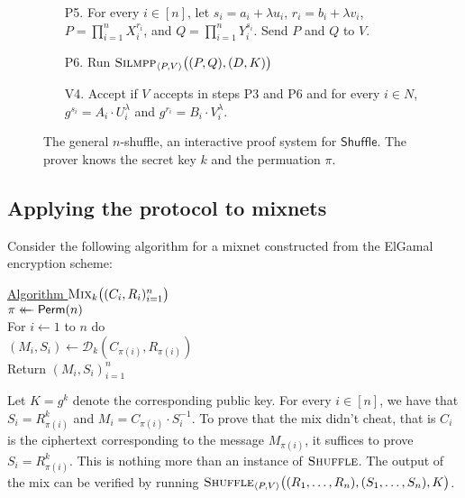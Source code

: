 \documentclass[letter]{article}
\newcommand{\getsr}{\mathrel{\leftarrow\mkern-14mu\leftarrow}}
\newcommand{\brackets}[1]{\langle #1 \rangle}
\newcommand{\Perm}{\textsf{Perm}}
\newcommand{\dec}{\mathcal{D}}
\begin{document}
\begin{figure}[h]
{\begin{enumerate}
    \vspace{4pt}
    \item[P5.] For every $i \in [n]$, let $s_i = a_i + \lambda u_i$,
      $r_i = b_i + \lambda v_i$, $P = \prod_{i=1}^n X_i^{r_i}$, and
      $Q = \prod_{i=1}^n Y_i^{s_i}$. Send $P$ and $Q$ to $V$.

    \vspace{4pt}
    \item[P6.] Run $\textsc{Silmpp}_{\brackets{P,V}}\big( (P,Q), (D,K) \big)$

    \vspace{4pt}
    \item[V4.] Accept if $V$ accepts in steps P3 and P6 and for every $i \in N$,
      $g^{s_i} = A_i \cdot U_i^\lambda$ and
      $g^{r_i} = B_i \cdot V_i^\lambda$.

  \end{enumerate}
  }
  \caption{The general $n$-shuffle, an interactive proof system for
    $\textsf{Shuffle}$. The prover knows the secret key  $k$ and the permuation
    $\pi$.
  }
  \label{fig-shuffle}
\end{figure}

\subsection{Applying the protocol to mixnets} \label{sec-mix-shuffle}
Consider the following algorithm for a mixnet constructed from the ElGamal
encryption scheme:
\newcommand{\ind}{\hspace{12pt}}
\begin{tabbing}
  \underline{Algorithm $\textsc{Mix}_k\big( (C_i, R_i)_{i=1}^n \big)$}\\[4pt]
  \ind $\pi \getsr \Perm(n)$\\
  \ind For $i \gets 1$ to $n$ do \\
  \ind\ind $(M_i, S_i) \gets \dec_k(C_{\pi(i)}, R_{\pi(i)})$ \\
  \ind Return $(M_i, S_i)_{i=1}^n$
\end{tabbing}
Let $K = g^k$ denote the corresponding public key.
For every $i \in [n]$, we have that $S_i = R_{\pi(i)}^k$ and $M_i = C_{\pi(i)}
\cdot S_i^{-1}$. To prove that the mix didn't cheat, that is $C_{i}$ is the ciphertext
corresponding to the message $M_{\pi(i)}$, it suffices to prove $S_i =
R_{\pi(i)}^k$. This is nothing more than an instance of $\textsc{Shuffle}$. The
output of the mix can be verified by running
$\textsc{Shuffle}_{\brackets{P,V}}\big( (R_1, \dots, R_n), (S_1, \dots, S_n), K
\big)$.
\end{document}
